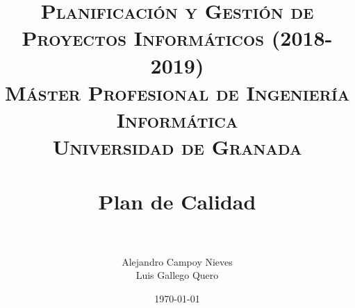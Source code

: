 

\title{	
	\normalfont \normalsize 
	\textsc{\textbf{Planificación y Gestión de Proyectos Informáticos (2018-2019)} \\ Máster Profesional de Ingeniería Informática \\ Universidad de Granada} \\ [25pt] %
	\horrule{0.5pt} \\[0.4cm] %
	\huge Plan de Calidad \\ %
	\horrule{2pt} \\[0.5cm] %
}

\author{Alejandro Campoy Nieves \\ Luis Gallego Quero} %
\date{\normalsize\today} %

\usepackage[spanish, es-tabla]{babel}
\usepackage{hyperref} %
\hypersetup{
	colorlinks=true,
	linkcolor=blue,
	filecolor=magenta,      
	urlcolor=blue,
}
\usepackage{graphicx}
\usepackage{amssymb, amsmath, amsbsy}
\usepackage{mathptmx}	
\usepackage{float}
\usepackage{booktabs}					%
\usepackage{eurosym}

\usepackage[table]{xcolor}
\usepackage{color}
\usepackage{colortbl}
\usepackage{multicol}
\usepackage{multirow}
\usepackage{booktabs}
\usepackage{tabularx}
\usepackage{array}
\usepackage{caption}
\usepackage{subcaption}




	\maketitle %
	
	\newpage %
	
	\tableofcontents %
	
	
